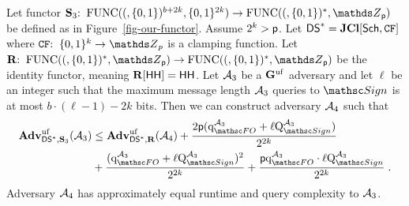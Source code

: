 \begin{lemma}\label{lm-ourF3} Let functor $\ourF_3\Colon \AllFuncs(\bits^{b+2k},\bits^{2k}) \to \AllFuncs(\bits^*,\Z_{\Prime})$ be defined as in Figure~\ref{fig-our-functor}. Assume $2^k > \mathsf{p}$. Let $\mathsf{DS}^* = \mathbf{JCl}[\mathsf{Sch},\mathtt{CF}]$ where $\CFEDSA\Colon\bits^k\to\Z_p$ is a clamping function. Let $\construct{R}\Colon\AllFuncs(\bits^*,\Z_{\Prime})\to \AllFuncs(\bits^*,\Z_{\Prime})$ be the identity functor, meaning $\mathbf{R}[\mathsf{HH}]=\mathsf{HH}$. Let $\mathcal{A}_3$ be a $\mathbf{G}^{\mathrm{uf}}$ adversary 
and let $\ell$ be an integer such that the maximum message length
	$\mathcal{A}_3$ queries to $\SignO$ is at most $ b \cdot (\ell-1) - 2k$ bits. Then we can construct adversary $\mathcal{A}_4$ such that
\begin{align}
	\ufAdv{\jDS,\ourF_3}{\advA_3} & \leq \ufAdv{\jDS,\construct{R}}{\advA_4}+ \frac{2\Prime(\QueriesD{\HASH}{\advA_3}+ \ell \Queries{\SignO}{\advA_3})}{2^{2k}} \\
	& + \frac{(\QueriesD{\HASH}{\advA_3}+ \ell \Queries{\SignO}{\advA_3})^2}{2^{2k}}+ \frac{\Prime \QueriesD{\HASH}{\advA_3}\cdot \ell \Queries{\SignO}{\advA_3}}{2^{2k}} \;.
\end{align}
	Adversary $\mathcal{A}_4$ has approximately equal runtime and query complexity to $\mathcal{A}_3$.
\end{lemma}
